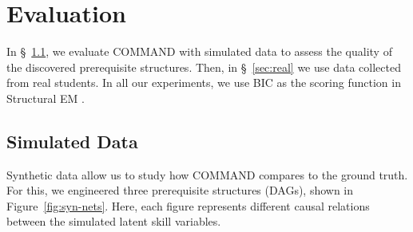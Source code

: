 \documentclass{edm_template}
\begin{document}
\section{Evaluation}
In \S~\ref{sec:synthetic}, we evaluate COMMAND with simulated data  to assess the quality of the discovered prerequisite structures.
Then, in \S~\ref{sec:real} we use  data collected from real students.
In all our experiments, we use BIC as the scoring function in Structural EM . 

	\subsection{Simulated Data}
	\label{sec:synthetic}
	
	Synthetic data allow us to study how COMMAND compares to the ground truth.
	For this, we engineered three prerequisite structures (DAGs), shown in Figure~\ref{fig:syn-nets}.
	Here, each figure represents different causal relations between the simulated latent skill variables.
	
\end{document}
